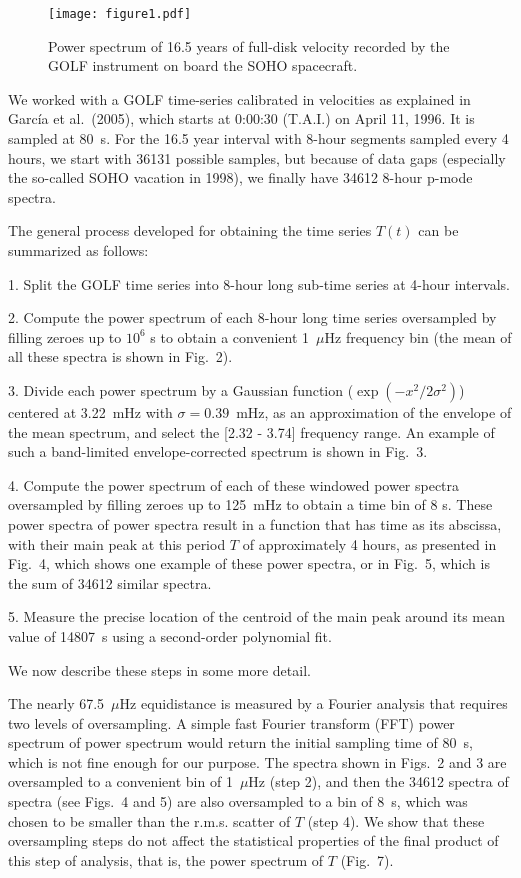 \documentclass[bibyear]{aa}
\begin{document}
\begin{figure}
\centering
\texttt{[image: figure1.pdf]}
\caption{Power spectrum of 16.5 years of full-disk velocity recorded by the GOLF instrument on board the SOHO spacecraft.}
\label{fig:PS16y}
\end{figure} 


We worked with a GOLF time-series calibrated in velocities as explained in Garc\'ia et al.~(2005), which starts at 0:00:30 (T.A.I.) on April 11, 1996. It is sampled at 80~s. For the 16.5 year interval with 8-hour segments sampled every 4 hours, we start with 36131 possible samples, but because of data gaps (especially the so-called SOHO vacation in 1998), we finally have 34612 8-hour p-mode spectra.

The general process developed for obtaining the time series $T(t)$ can be summarized as follows:

1. Split the GOLF  time series into 8-hour long sub-time series at 4-hour intervals.

2. Compute the power spectrum of each 8-hour long time series oversampled by filling zeroes up to $10^6$ s to obtain a convenient 1~$\mu$Hz frequency bin (the mean of all these spectra is shown in Fig.~2).


3. Divide each power spectrum by a Gaussian function ($\exp(-x^2/2\sigma^2)$) centered at 3.22~mHz with $\sigma=0.39$~mHz, as an approximation of the envelope of the mean spectrum, and select  the [2.32 - 3.74] frequency range. An example of such a band-limited envelope-corrected spectrum is shown in Fig.~3.

4. Compute the power spectrum of each of these windowed power spectra oversampled by filling zeroes up to 125~mHz to obtain a time bin of 8 s. These power spectra of power spectra result in a function that has time as its abscissa, with their main peak at this period $T$ of approximately 4 hours, as presented
in Fig.~4, which shows one example of these power spectra, or in Fig.~5, which is the sum of 34612 similar spectra.


5. Measure the precise location of the centroid of the main peak around its mean value of 14807~s using a second-order polynomial fit.

We now describe these steps in some more detail.

The nearly 67.5~$\mu$Hz equidistance is measured by a Fourier analysis that requires two levels of oversampling.  A simple fast Fourier transform (FFT) power spectrum of power spectrum would return the initial sampling time of 80~s, which  is not fine enough for our purpose. The spectra shown in Figs.~2 and 3 are oversampled to a convenient bin of 1~$\mu$Hz (step 2), and then the 34612 spectra of spectra (see Figs.~4 and 5) are also oversampled to a bin of 8~s, which was chosen to be smaller than the r.m.s. scatter of $T$ (step 4). We show that these oversampling steps do not affect the statistical properties of the final product of this step of analysis, that is, the power spectrum of $T$ (Fig.~7).
\end{document}
